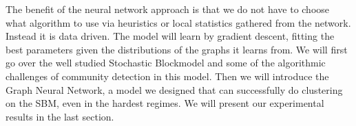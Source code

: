 The benefit of the neural network approach is that we do not have to choose what algorithm to use via heuristics or local statistics gathered from the network.  Instead it is data driven.  The model will learn by gradient descent, fitting the best parameters given the distributions of the graphs it learns from.  We will first go over the well studied Stochastic Blockmodel and some of the algorithmic challenges of community detection in this model. Then we will introduce the Graph Neural Network, a model we designed that can successfully do clustering on the SBM, even in the hardest regimes.  We will present our experimental results in the last section.  

